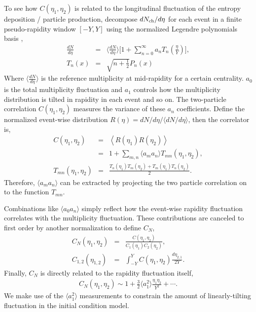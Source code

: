To see how $C(\eta_1, \eta_2)$ is related to the longitudinal fluctuation of the entropy deposition / particle production, decompose $dN_\text{ch}/d\eta$ for each event in a finite pseudo-rapidity window $[-Y, Y]$ using the normalized Legendre polynomials basis \cite{Bzdak:2012tp, Jia:2015jga, ATLAS:2015kla},
\begin{eqnarray}
\frac{dN}{d\eta} &=& \biggl\langle\frac{dN}{d\eta}\biggr\rangle \biggl[1 + \sum_{n=0}^\infty a_n T_n\left(\frac{\eta}{Y}\right) \biggr],\\
T_n(x) &=& \sqrt{n + \frac{1}{2}} P_n(x)
\end{eqnarray}
Where $\langle\frac{dN}{d\eta}\rangle$ is the reference multiplicity at mid-rapidity for a certain centrality.
$a_0$ is the total multiplicity fluctuation and $a_1$ controls how the multiplicity distribution is tilted in rapidity in each event and so on.
The two-particle correlation $C(\eta_1, \eta_2)$ measures the variance of these $a_n$ coefficients.
Define the normalized event-wise distribution $R(\eta) = dN/d\eta /\langle dN/d\eta\rangle$, then the correlator is,
\begin{eqnarray}
C(\eta_1, \eta_2) &=& \left\langle R(\eta_1) R(\eta_2)\right\rangle \\
&=& 1 + \sum_{m, n}\langle a_m a_n\rangle  T_{mn}(\eta_1, \eta_2),\\
T_{mn}(\eta_1, \eta_2) &=& \frac{T_n(\eta_1)T_m(\eta_2) + T_m(\eta_1)T_n(\eta_2)}{2}.
\end{eqnarray}
Therefore, $\langle a_m a_n\rangle$ can be extracted by projecting the two particle correlation on to the function $T_{mn}$.

Combinations like $\langle a_0 a_n\rangle$ simply reflect how the event-wise rapidity fluctuation correlates with the multiplicity fluctuation. 
These contributions are canceled to first order by another normalization to define $C_N$,
\begin{eqnarray}
 C_N(\eta_1, \eta_2) &=& \frac{C(\eta_1, \eta_2)}{C_1(\eta_1)C_2(\eta_2)},\\
C_{1,2}(\eta_{1,2}) &=& \int_{-Y}^{Y}C(\eta_1, \eta_2)\frac{d\eta_{2,1}}{2Y}.
\end{eqnarray}
Finally, $C_N$ is directly related to the rapidity fluctuation itself,
\begin{eqnarray}
C_N(\eta_1, \eta_2) \sim 1 + \frac{3}{2}\langle a_1 ^2 \rangle \frac{\eta_1\eta_2}{Y^2} + \cdots.
\end{eqnarray}
We make use of the $\langle a_1 ^2 \rangle$ measurements to constrain the amount of linearly-tilting fluctuation in the initial condition model.

